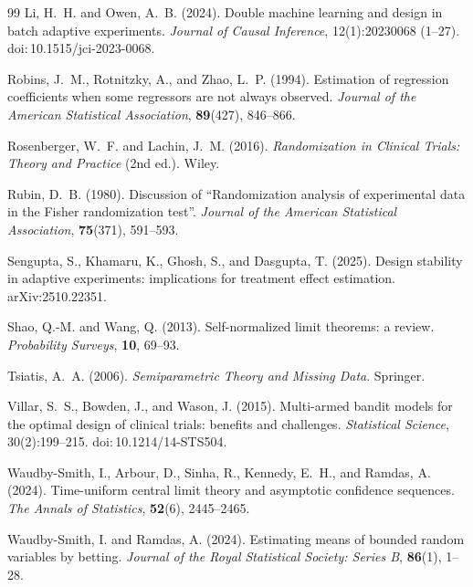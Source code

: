 \documentclass[11pt]{article}
\numberwithin{equation}{section}
\theoremstyle{plain}
\theoremstyle{definition}
\theoremstyle{remark}
\newcommand{\doi}[1]{doi:\,#1}
\newcommand{\arxiv}[1]{arXiv:#1}
\begin{document}
\begin{thebibliography}{99}
Li, H.~H. and Owen, A.~B. (2024).
Double machine learning and design in batch adaptive experiments.
\emph{Journal of Causal Inference}, 12(1):20230068 (1--27). \doi{10.1515/jci-2023-0068}.

Robins, J.~M., Rotnitzky, A., and Zhao, L.~P. (1994).
Estimation of regression coefficients when some regressors are not always observed.
\emph{Journal of the American Statistical Association}, \textbf{89}(427), 846--866.

Rosenberger, W.~F. and Lachin, J.~M. (2016).
\emph{Randomization in Clinical Trials: Theory and Practice} (2nd ed.).
Wiley.

Rubin, D.~B. (1980).
Discussion of ``Randomization analysis of experimental data in the Fisher randomization test''.
\emph{Journal of the American Statistical Association}, \textbf{75}(371), 591--593.

Sengupta, S., Khamaru, K., Ghosh, S., and Dasgupta, T. (2025).
Design stability in adaptive experiments: implications for treatment effect estimation.
\arxiv{2510.22351}.

Shao, Q.-M. and Wang, Q. (2013).
Self-normalized limit theorems: a review.
\emph{Probability Surveys}, \textbf{10}, 69--93.

Tsiatis, A.~A. (2006).
\emph{Semiparametric Theory and Missing Data}.
Springer.

Villar, S.~S., Bowden, J., and Wason, J. (2015).
Multi-armed bandit models for the optimal design of clinical trials: benefits and challenges.
\emph{Statistical Science}, 30(2):199--215. \doi{10.1214/14-STS504}.

Waudby-Smith, I., Arbour, D., Sinha, R., Kennedy, E.~H., and Ramdas, A. (2024).
Time-uniform central limit theory and asymptotic confidence sequences.
\emph{The Annals of Statistics}, \textbf{52}(6), 2445--2465.

Waudby-Smith, I. and Ramdas, A. (2024).
Estimating means of bounded random variables by betting.
\emph{Journal of the Royal Statistical Society: Series B}, \textbf{86}(1), 1--28.


\end{thebibliography}
\end{document}
